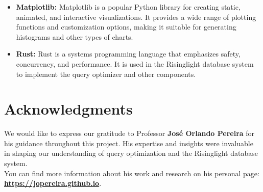 \documentclass[a4paper,12pt]{scrreprt}
\renewcommand{\headrulewidth}{0pt} %
\begin{document}
\begin{itemize}
    \item \textbf{Matplotlib:} Matplotlib is a popular Python library for creating static, animated, and interactive visualizations. It provides a wide range of plotting functions and customization options, making it suitable for generating histograms and other types of charts.
    \item \textbf{Rust:} Rust is a systems programming language that emphasizes safety, concurrency, and performance. It is used in the Risinglight database system to implement the query optimizer and other components.
\end{itemize}

\section{Acknowledgments}
We would like to express our gratitude to Professor \textbf{José Orlando Pereira} for his guidance throughout this project. His expertise and insights were invaluable in shaping our understanding of query optimization and the Risinglight database system. \\
You can find more information about his work and research on his personal page:\\
\textbf{ \href{https://jopereira.github.io}{https://jopereira.github.io}}. \\



\renewcommand{\headrulewidth}{0pt}
\end{document}
